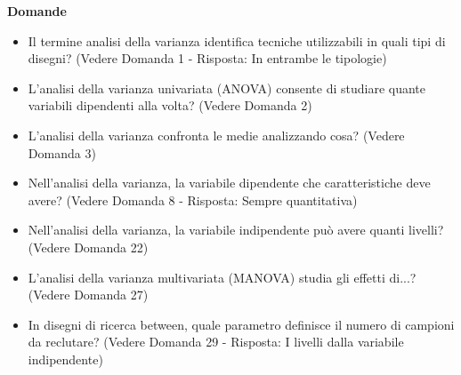 \documentclass[12pt, a4paper]{article}
\newenvironment{reflectionbox}{%
    \medskip
    \begin{framed}\par\noindent
    \textbf{\color{boxtitlecolor}Domande} \par
    \begin{itemize}[leftmargin=*, label=$\blacktriangleright$]
}{%
    \end{itemize}\par
    \end{framed}
    \medskip
}
\begin{document}
\begin{reflectionbox}
    \item Il termine analisi della varianza identifica tecniche utilizzabili in quali tipi di disegni? (Vedere Domanda 1 - Risposta: In entrambe le tipologie)
    \item L'analisi della varianza univariata (ANOVA) consente di studiare quante variabili dipendenti alla volta? (Vedere Domanda 2)
    \item L'analisi della varianza confronta le medie analizzando cosa? (Vedere Domanda 3)
    \item Nell'analisi della varianza, la variabile dipendente che caratteristiche deve avere? (Vedere Domanda 8 - Risposta: Sempre quantitativa)
    \item Nell'analisi della varianza, la variabile indipendente può avere quanti livelli? (Vedere Domanda 22)
    \item L'analisi della varianza multivariata (MANOVA) studia gli effetti di...? (Vedere Domanda 27)
    \item In disegni di ricerca between, quale parametro definisce il numero di campioni da reclutare? (Vedere Domanda 29 - Risposta: I livelli dalla variabile indipendente)
\end{reflectionbox}
\end{document}
